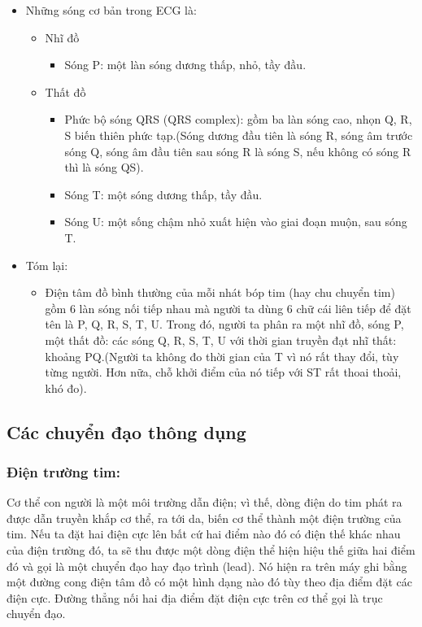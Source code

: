 \begin{itemize}
    \item Những sóng cơ bản trong ECG là:
    \begin{itemize}
        \item Nhĩ đồ
        \begin{itemize}
            \item Sóng P: một làn sóng dương thấp, nhỏ, tầy đầu.
        \end{itemize}
        \item Thất đồ
        \begin{itemize}
            \item Phức bộ sóng QRS (QRS complex): gồm ba làn sóng cao, nhọn Q, R, S biến thiên phức tạp.(Sóng dương đầu tiên là sóng R, sóng âm trước sóng Q, sóng âm đầu tiên sau sóng R là sóng S, nếu không có sóng R thì là sóng QS).
            \item Sóng T: một sóng dương thấp, tầy đầu.
            \item Sóng U: một sống chậm nhỏ xuất hiện vào giai đoạn muộn, sau sóng T.
        \end{itemize}        
    \end{itemize}
    \item Tóm lại:
    \begin{itemize}
        \item Điện tâm đồ bình thường của mỗi nhát bóp tim (hay chu chuyển tim) gồm 6 làn
        sóng nối tiếp nhau mà người ta dùng 6 chữ cái liên tiếp để đặt tên là P, Q, R, S, T, U. Trong đó,
        người ta phân ra một nhĩ đồ, sóng P, một thất đồ: các sóng Q, R, S, T, U với thời gian truyền đạt
        nhĩ thất: khoảng PQ.(Người ta không đo thời gian của T vì nó rất thay đổi, tùy từng người. Hơn nữa, chỗ khởi điểm của nó tiếp với ST rất thoai thoải, khó đo).
    \end{itemize}
\end{itemize}

\subsection{Các chuyển đạo thông dụng}

\subsubsection{Điện trường tim:}
Cơ thể con người là một môi trường dẫn điện; vì thế, dòng điện do tim phát ra được dẫn truyền khắp cơ thể, ra tới da, biến cơ thể thành một điện trường của tim. Nếu ta đặt hai điện cực lên bất cứ hai điểm nào đó có điện thế khác nhau của điện trường đó, ta sẽ thu được một dòng điện thể hiện hiệu thế giữa hai điểm đó và gọi là một chuyển đạo hay đạo trình (lead). Nó hiện ra trên máy ghi bằng một đường cong điện tâm đồ có một hình dạng nào đó tùy theo địa điểm đặt các điện cực. Đường thẳng nối hai địa điểm đặt điện cực trên cơ thể gọi là trục chuyển đạo.

